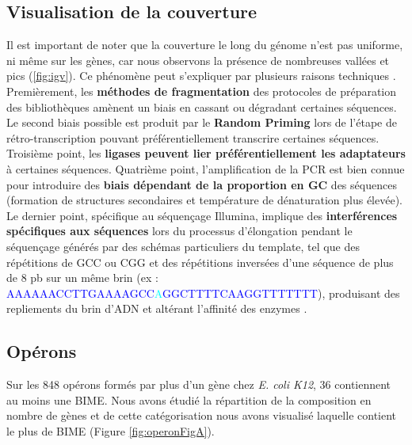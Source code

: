 \documentclass[12pt,a4paper]{report}
\begin{document}
\begin{onehalfspace}
\subsection*{Visualisation de la couverture}
\label{uniformite_couverture}
Il est important de noter que la couverture le long du génome n'est pas uniforme, ni même sur les gènes, car nous observons la présence de nombreuses vallées et pics (\autoref{fig:igv}). Ce phénomène peut s'expliquer par plusieurs raisons techniques \citep{Li2013}. Premièrement, les \textbf{méthodes de fragmentation} des protocoles de préparation des bibliothèques amènent un biais en cassant ou dégradant certaines séquences. Le second biais possible est produit par le \textbf{Random Priming} lors de l'étape de rétro-transcription pouvant préférentiellement transcrire certaines séquences. Troisième point, les \textbf{ligases peuvent lier préférentiellement les adaptateurs} à certaines séquences. Quatrième point, l'amplification de la PCR est bien connue pour introduire des \textbf{biais dépendant de la proportion en GC} des séquences (formation de structures secondaires et température de dénaturation plus élevée). Le dernier point, spécifique au séquençage Illumina, implique des \textbf{interférences spécifiques aux séquences} lors du processus d'élongation pendant le séquençage générés par des schémas particuliers du template, tel que des répétitions de GCC ou CGG et des répétitions inversées d'une séquence de plus de 8 pb sur un même brin (ex : \textcolor{blue}{AAAAAACCTTGAAAAGCC}\textcolor{cyan}{A}\textcolor{blue}{GGCTTTTCAAGGTTTTTTT}), produisant des repliements du brin d'ADN et altérant l'affinité des enzymes \citep{Nakamura2011}.

\subsection*{Opérons}
Sur les 848 opérons formés par plus d'un gène chez \textit{E. coli K12}, 36 contiennent au moins une BIME. Nous avons étudié la répartition de la composition en nombre de gènes et de cette catégorisation nous avons visualisé laquelle contient le plus de BIME (Figure \autoref{fig:operonFigA}).


\end{onehalfspace}
\end{document}
